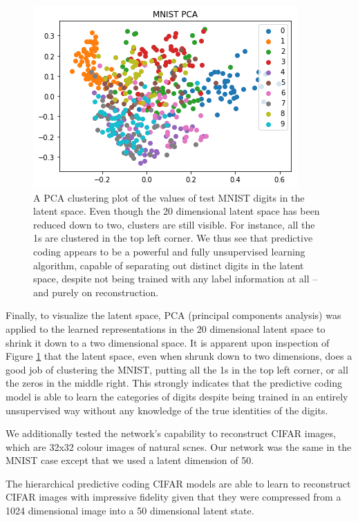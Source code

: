\begin{figure}[H]
\centering
\includegraphics[scale=0.6]{chapter_3_figures/mnist_pca.png}
\caption{A PCA clustering plot of the values of test MNIST digits in the latent space. Even though the 20 dimensional latent space has been reduced down to two, clusters are still visible. For instance, all the 1s are clustered in the top left corner. We thus see that predictive coding appears to be a powerful and fully unsupervised learning algorithm, capable of separating out distinct digits in the latent space, despite not being trained with any label information at all -- and purely on reconstruction.}
\label{PCA_figure}
\end{figure}

Finally, to visualize the latent space, PCA (principal components analysis) was applied to the learned representations in the 20 dimensional latent space to shrink it down to a two dimensional space. It is apparent upon inspection of Figure \ref{PCA_figure} that the latent space, even when shrunk down to two dimensions, does a good job of clustering the MNIST, putting all the 1s in the top left corner, or all the zeros in the middle right. This strongly indicates that the predictive coding model is able to learn the categories of digits despite being trained in an entirely unsupervised way without any knowledge of the true identities of the digits.

We additionally tested the network's capability to reconstruct CIFAR images, which are 32x32 colour images of natural scnes. Our network was the same in the MNIST case except that we used a latent dimension of 50. 

The hierarchical predictive coding CIFAR models are able to learn to reconstruct CIFAR images with impressive fidelity given that they were compressed from a 1024 dimensional image into a 50 dimensional latent state.

